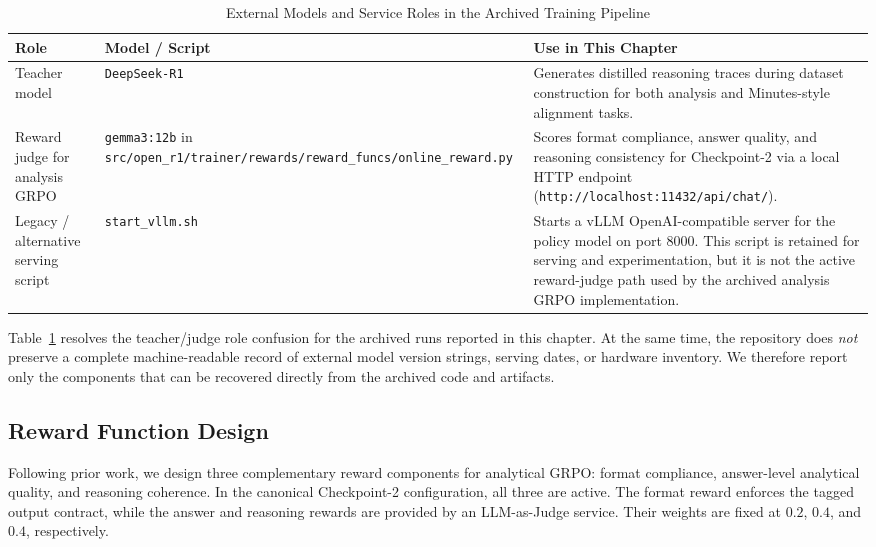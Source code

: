 \begin{table}[htbp]
    \centering
    \footnotesize
    \begin{tabular}{p{} p{} p{}}
    \toprule
    \textbf{Role} & \textbf{Model / Script} & \textbf{Use in This Chapter} \\
    \midrule
    Teacher model & \texttt{DeepSeek-R1} & Generates distilled reasoning traces during dataset construction for both analysis and Minutes-style alignment tasks. \\
    Reward judge for analysis GRPO & \texttt{gemma3:12b} in \texttt{src/open\_r1/trainer/rewards/reward\_funcs/online\_reward.py} & Scores format compliance, answer quality, and reasoning consistency for Checkpoint-2 via a local HTTP endpoint (\texttt{http://localhost:11432/api/chat/}). \\
    Legacy / alternative serving script & \texttt{start\_vllm.sh} & Starts a vLLM OpenAI-compatible server for the policy model on port 8000. This script is retained for serving and experimentation, but it is not the active reward-judge path used by the archived analysis GRPO implementation. \\
    \bottomrule
\end{tabular}
    \caption{External Models and Service Roles in the Archived Training Pipeline}
    \label{tab:ch2:external_model_roles}
\end{table}

Table~\ref{tab:ch2:external_model_roles} resolves the teacher/judge role confusion for the archived runs reported in this chapter. At the same time, the repository does \textit{not} preserve a complete machine-readable record of external model version strings, serving dates, or hardware inventory. We therefore report only the components that can be recovered directly from the archived code and artifacts.



\subsection*{Reward Function Design}\label{ch2:sec:mode_training:reward_function}
% 

Following prior work, we design three complementary reward components for analytical GRPO: format compliance, answer-level analytical quality, and reasoning coherence. In the canonical Checkpoint-2 configuration, all three are active. The format reward enforces the tagged output contract, while the answer and reasoning rewards are provided by an LLM-as-Judge service. Their weights are fixed at $0.2$, $0.4$, and $0.4$, respectively.

